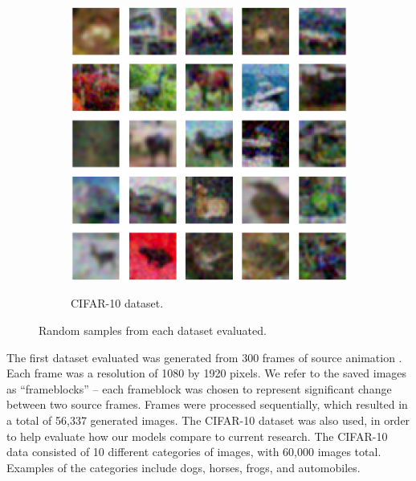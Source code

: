 \documentclass[letterpaper]{article} %
\begin{document}
\begin{figure}[h!]
\begin{subfigure}{0.22\textwidth}
\begin{center}
\begin{minipage}[t]{0.95\linewidth}
\begin{centering}
{\includegraphics[width=\linewidth]{cifar_samplesxrange.png}}
\caption{CIFAR-10 dataset.}
\label{fig:cifar_dataset}
\end{centering}
\end{minipage}
\end{center}
\end{subfigure}
\caption{Random samples from each dataset evaluated.}
\label{fig:datasets}
\end{figure}

The first dataset evaluated was generated from 300 frames of source animation \cite{animation}.
Each frame was a resolution of 1080 by 1920 pixels.
We refer to the saved images as ``frameblocks'' --
each frameblock was chosen to represent significant change between two source frames.
Frames were processed sequentially, which resulted in a total of 56,337 generated images.
The CIFAR-10 dataset was also used, in order to help evaluate how our models
compare to current research.
The CIFAR-10 data consisted of 10 different categories of images, with 60,000 images total.
Examples of the categories include dogs, horses, frogs, and automobiles.
\end{document}
